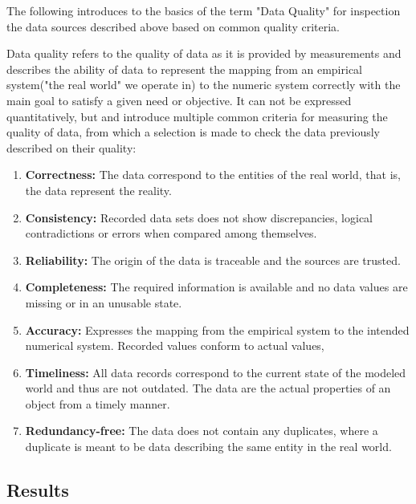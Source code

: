 The following introduces to the basics of the term "Data Quality" for inspection the data sources
described above based on common quality criteria.

Data quality refers to the quality of data as it is provided by measurements and describes the
ability of data to represent the mapping from an empirical system("the real world" we operate in)
to the numeric system correctly with the main goal to satisfy a given need or objective.
It can not be expressed quantitatively, but \cite{Daqua13} and  \cite{Ebert07} introduce multiple
common criteria for measuring the quality of data, from which a selection is made to check the data
previously described on their quality:

\begin{enumerate}
    \item \textbf{Correctness:}
    The data correspond to the entities of the real world, that is, the data represent the reality.

    \item \textbf{Consistency:}
    Recorded data sets does not show discrepancies, logical contradictions or errors when compared
    among themselves.

    \item \textbf{Reliability:}
    The origin of the data is traceable and the sources are trusted.

    \item \textbf{Completeness:}
    The required information is available and no data values are missing or in an unusable state.

    \item \textbf{Accuracy:}
    Expresses the mapping from the empirical system to the intended numerical system. Recorded values
    conform to actual values,

    \item \textbf{Timeliness:}
    All data records correspond to the current state of the modeled world and thus are not outdated.
    The data are the actual properties of an object from a timely manner.

    \item \textbf{Redundancy-free:}
    The data does not contain any duplicates, where a duplicate is meant to be data describing the same entity
    in the real world.
\end{enumerate}

\subsection{Results}

